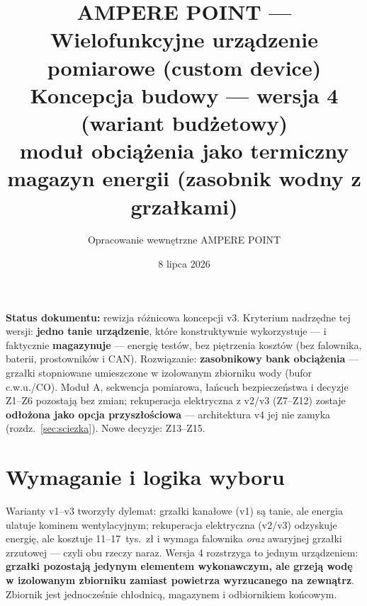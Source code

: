 \documentclass[11pt,a4paper]{article}
\title{\textbf{AMPERE POINT --- Wielofunkcyjne urządzenie pomiarowe (custom device)}\\[4pt]
\large Koncepcja budowy --- wersja 4 (wariant budżetowy)\\
moduł obciążenia jako termiczny magazyn energii (zasobnik wodny z grzałkami)}
\author{Opracowanie wewnętrzne AMPERE POINT}
\date{8 lipca 2026}
\begin{document}
\maketitle
\vspace{-1.5em}

\noindent\textbf{Status dokumentu:} rewizja różnicowa koncepcji v3. Kryterium nadrzędne tej wersji:
\textbf{jedno tanie urządzenie}, które konstruktywnie wykorzystuje --- i faktycznie \textbf{magazynuje}
--- energię testów, bez piętrzenia kosztów (bez falownika, baterii, prostowników i CAN).
Rozwiązanie: \textbf{zasobnikowy bank obciążenia} --- grzałki stopniowane umieszczone w izolowanym
zbiorniku wody (bufor c.w.u./CO). Moduł A, sekwencja pomiarowa, łańcuch bezpieczeństwa i decyzje
Z1--Z6 pozostają bez zmian; rekuperacja elektryczna z v2/v3 (Z7--Z12) zostaje \textbf{odłożona jako
opcja przyszłościowa} --- architektura v4 jej nie zamyka (rozdz.~\ref{sec:sciezka}). Nowe decyzje:
Z13--Z15.

\tableofcontents

\section{Wymaganie i logika wyboru}
Warianty v1--v3 tworzyły dylemat: grzałki kanałowe (v1) są tanie, ale energia ulatuje kominem
wentylacyjnym; rekuperacja elektryczna (v2/v3) odzyskuje energię, ale kosztuje 11--17~tys.~zł
i wymaga falownika \emph{oraz} awaryjnej grzałki zrzutowej --- czyli obu rzeczy naraz. Wersja 4
rozstrzyga to jednym urządzeniem: \textbf{grzałki pozostają jedynym elementem wykonawczym, ale
grzeją wodę w izolowanym zbiorniku zamiast powietrza wyrzucanego na zewnątrz}. Zbiornik jest
jednocześnie chłodnicą, magazynem i odbiornikiem końcowym.
\end{document}

